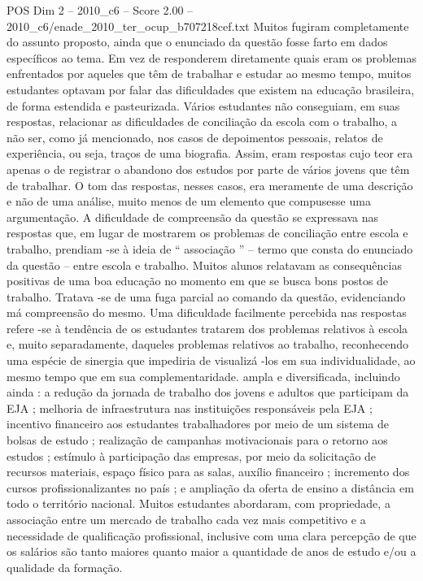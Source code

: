 \begin{textsample}{POS Dim 2 – 2010\_c6 – Score 2.00 – 2010\_c6/enade\_2010\_ter\_ocup\_b707218cef.txt}
Muitos fugiram completamente do assunto proposto, ainda que o enunciado da questão fosse farto em dados específicos ao tema.
Em vez de responderem diretamente quais eram os problemas enfrentados por aqueles que têm de trabalhar e estudar ao mesmo tempo, muitos estudantes optavam por falar das dificuldades que existem na educação brasileira, de forma estendida e pasteurizada.
Vários estudantes não conseguiam, em suas respostas, relacionar as dificuldades de conciliação da escola com o trabalho, a não ser, como já mencionado, nos casos de depoimentos pessoais, relatos de experiência, ou seja, traços de uma biografia.
Assim, eram respostas cujo teor era apenas o de registrar o abandono dos estudos por parte de vários jovens que têm de trabalhar.
O tom das respostas, nesses casos, era meramente de uma descrição e não de uma análise, muito menos de um elemento que compusesse uma argumentação.
A dificuldade de compreensão da questão se expressava nas respostas que, em lugar de mostrarem os problemas de conciliação entre escola e trabalho, prendiam -se à ideia de “ associação ” – termo que consta do enunciado da questão – entre escola e trabalho.
Muitos alunos relatavam as consequências positivas de uma boa educação no momento em que se busca bons postos de trabalho.
Tratava -se de uma fuga parcial ao comando da questão, evidenciando má compreensão do mesmo.
Uma dificuldade facilmente percebida nas respostas refere -se à tendência de os estudantes tratarem dos problemas relativos à escola e, muito separadamente, daqueles problemas relativos ao trabalho, reconhecendo uma espécie de sinergia que impediria de visualizá -los em sua individualidade, ao mesmo tempo que em sua complementaridade. ampla e diversificada, incluindo ainda : a redução da jornada de trabalho dos jovens e adultos que participam da EJA ; melhoria de infraestrutura nas instituições responsáveis pela EJA ; incentivo financeiro aos estudantes trabalhadores por meio de um sistema de bolsas de estudo ; realização de campanhas motivacionais para o retorno aos estudos ; estímulo à participação das empresas, por meio da solicitação de recursos materiais, espaço físico para as salas, auxílio financeiro ; incremento dos cursos profissionalizantes no país ; e ampliação da oferta de ensino a distância em todo o território nacional.
Muitos estudantes abordaram, com propriedade, a associação entre um mercado de trabalho cada vez mais competitivo e a necessidade de qualificação profissional, inclusive com uma clara percepção de que os salários são tanto maiores quanto maior a quantidade de anos de estudo e/ou a qualidade da formação.

\end{textsample}

